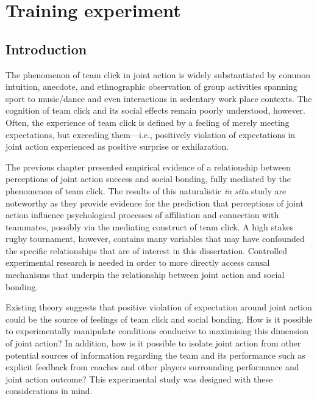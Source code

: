 

\begin{savequote}[8cm]

  \qauthor{}
\end{savequote}



\chapter{\label{chap:trainingExperiment}Training experiment}

\minitoc


\section{Introduction}
The phenomenon of team click in joint action is widely substantiated by common intuition, anecdote, and ethnographic observation of group activities spanning sport to music/dance and even interactions in sedentary work place contexts.  The cognition of team click and its social effects remain poorly understood, however.  Often, the experience of team click is defined by a feeling of merely meeting expectations, but exceeding them---i.e., positively violation of expectations in joint action experienced as positive surprise or exhilaration.

The previous chapter presented empirical evidence of a relationship between perceptions of joint action success and social bonding, fully mediated by the phenomenon of team click.  The results of this naturalistic \textit{in situ} study are noteworthy as they provide evidence for the prediction that perceptions of joint action influence psychological processes of affiliation and connection with teammates, possibly via the mediating construct of team click.  A high stakes rugby tournament, however, contains many variables that may have confounded the specific relationships that are of interest in this dissertation.   Controlled experimental research is needed in order to more directly access causal mechanisms that underpin the relationship between joint action and social bonding.

Existing theory suggests that positive violation of expectation around joint action could be the source of feelings of team click and social bonding. How is it possible to experimentally manipulate conditions conducive to maximising this dimension of joint action? In addition, how is it possible to isolate joint action from other potential sources of information regarding the team and its performance such as explicit feedback from coaches and other players surrounding performance and joint action outcome?  This experimental study was designed with these considerations in mind.

